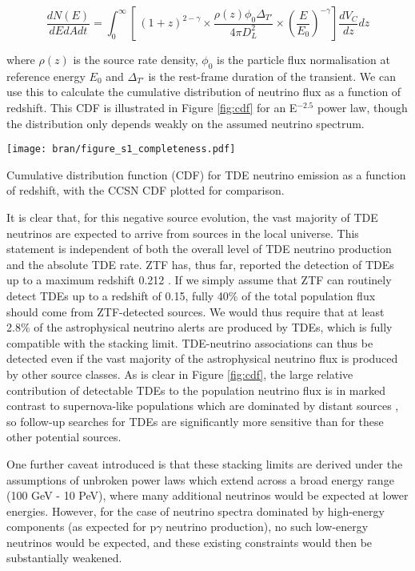 \begin{equation}
\frac{dN(E)}{dEdAdt} = \int_{0}^{\infty} \left[ \ (1+z)^{2 - \gamma} \times \frac{\rho(z)\phi_{0} \Delta_{T'}}{4 \pi D_{L}^{2}} \times \left( \frac{E}{E_{0}}\right) ^{-\gamma}  \right] \frac{dV_{C}}{dz} dz
\label{eq:nu_flux_tot}
\end{equation}

where $\rho(z)$ is the source rate density, $\phi_{0}$ is the particle flux normalisation at reference energy $E_{0}$ and $\Delta_{T'}$ is the rest-frame duration of the transient. We can use this to calculate the cumulative distribution of neutrino flux as a function of redshift. This CDF is illustrated in Figure \ref{fig:cdf} for an E$^{-2.5}$ power law, though the distribution only depends weakly on the assumed neutrino spectrum.

\begin{marginfigure}
	\centering \texttt{[image: bran/figure\_s1\_completeness.pdf]}
	\caption{Cumulative distribution function (CDF) for TDE neutrino emission as a function of redshift, with the CCSN CDF plotted for comparison.}
	\label{fig:cdf}
\end{marginfigure}

It is clear that, for this negative source evolution, the vast majority of TDE neutrinos are expected to arrive from sources in the local universe. This statement is independent of both the overall level of TDE neutrino production and the absolute TDE rate. ZTF has, thus far, reported the detection of TDEs up to a maximum redshift 0.212 \cite{van_velzen_20}. If we simply assume that ZTF can routinely detect TDEs up to a redshift of 0.15, fully 40\% of the total population flux should come from ZTF-detected sources. We would thus require that at least 2.8\% of the astrophysical neutrino alerts are produced by TDEs, which is fully compatible with the stacking limit. TDE-neutrino associations can thus be detected even if the vast majority of the astrophysical neutrino flux is produced by other source classes. As is clear in Figure \ref{fig:cdf}, the large relative contribution of detectable TDEs to the population neutrino flux is in marked contrast to supernova-like populations which are dominated by distant sources , so follow-up searches for TDEs are significantly more sensitive than for these other potential sources.

One further caveat introduced is that these stacking limits are derived under the assumptions of unbroken power laws which extend across a broad energy range (100 GeV - 10 PeV), where many additional neutrinos would be expected at lower energies.  However, for the case of neutrino spectra dominated by high-energy components (as expected for p$\gamma$ neutrino production), no such low-energy neutrinos would be expected, and these existing constraints would then be substantially weakened.

